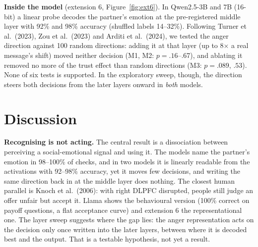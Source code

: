 \documentclass[10pt,a4paper]{article}
\begin{document}
\textbf{Inside the model} (extension 6, Figure~\ref{fig:ext6}). In Qwen2.5-3B and 7B (16-bit) a linear probe decodes
the partner's emotion at the pre-registered middle layer with 92\% and 98\% accuracy (shuffled labels 14--32\%).
Following Turner et al.\ (2023), Zou et al.\ (2023) and Arditi et al.\ (2024), we tested the anger direction against
100 random directions: adding it at that layer (up to 8$\times$ a real message's shift) moved neither decision
(M1, M2: $p=.16$--.67), and ablating it removed no more of the trust effect than random directions (M3: $p=.089$,
$.53$). None of six tests is supported. In the exploratory sweep, though, the direction steers both decisions from
the later layers onward in \emph{both} models.

\section{Discussion}

\textbf{Recognising is not acting.} The central result is a dissociation between perceiving a social-emotional signal
and using it. The models name the partner's emotion in 98--100\% of checks, and in two models it is linearly
readable from the activations with 92--98\% accuracy, yet it moves few decisions, and writing the same direction back
in at the middle layer does nothing. The closest human parallel is Knoch et al.\ (2006): with right DLPFC disrupted,
people still judge an offer unfair but accept it. Llama shows the behavioural version (100\% correct on payoff
questions, a flat acceptance curve) and extension 6 the representational one. The layer sweep suggests where the gap
lies: the anger representation acts on the decision only once written into the later layers, between where it is
decoded best and the output. That is a testable hypothesis, not yet a result.
\end{document}
